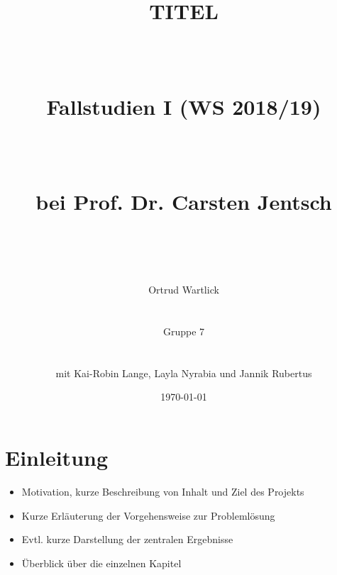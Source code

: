 \documentclass[a4paper,12pt]{article}
\begin{document}
\setlength{\parindent}{0em}  %


\begin{titlepage}

\title{
\vspace*{3cm}
\begin{Huge}TITEL\end{Huge}\\
\begin{Large}Fallstudien I (WS 2018/19)\end{Large}\\
\begin{large}bei Prof. Dr. Carsten Jentsch\end{large}\\
\vspace*{10cm}}

\author{
\begin{large}Ortrud Wartlick\end{large}\\
\begin{large}Gruppe 7\end{large}\\
\begin{large}mit Kai-Robin Lange, Layla Nyrabia und Jannik Rubertus\end{large}}

\date{
\vspace*{1cm}
\today}

\end{titlepage}
\maketitle
\thispagestyle{empty}

\newpage
\pagestyle{empty}
\tableofcontents 
\newpage
\pagestyle{plain}



\section{Einleitung}
\begin{itemize}
\item Motivation, kurze Beschreibung von Inhalt und Ziel des Projekts
\item Kurze Erläuterung der Vorgehensweise zur Problemlösung
\item Evtl. kurze Darstellung der zentralen Ergebnisse
\item Überblick über die einzelnen Kapitel
\end{itemize}
\end{document}
